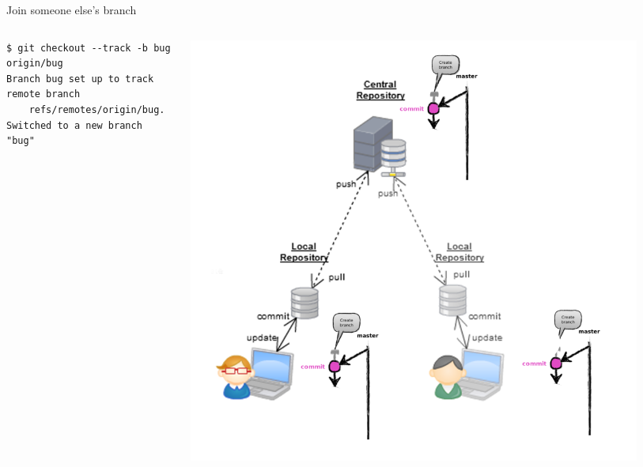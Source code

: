\begin{frame}[fragile]{Join someone else's branch}
\begin{columns}
	\begin{column}{0.6\textwidth}
	\begin{lstlisting}
$ git checkout --track -b bug origin/bug
Branch bug set up to track remote branch 
	refs/remotes/origin/bug.
Switched to a new branch "bug"
	\end{lstlisting}
	\end{column}
	\begin{column}{0.4\textwidth}
		\begin{center}
			\includegraphics[width=0.9\textwidth]{multiuser_track.png}
		\end{center}
	\end{column}
\end{columns}
\end{frame}


